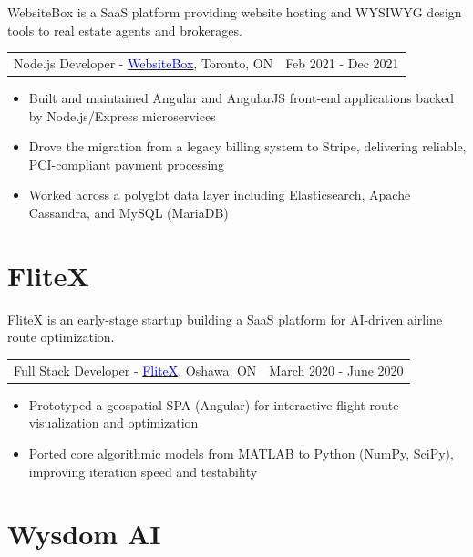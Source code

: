\documentclass[margin]{res}
\begin{document}
\begin{resume}
	WebsiteBox is a SaaS platform providing website hosting and WYSIWYG design tools
	to real estate agents and brokerages.

	\begin{tabular}{p{3in} r} %
		Node.js Developer - \href{https://websitebox.com}{\textcolor{blue}{WebsiteBox}}, Toronto, ON & Feb 2021 - Dec 2021
	\end{tabular}

	\begin{itemize} %
		\item Built and maintained Angular and AngularJS front-end applications backed by Node.js/Express microservices
		\item Drove the migration from a legacy billing system to Stripe, delivering reliable, PCI-compliant payment processing
		\item Worked across a polyglot data layer including Elasticsearch, Apache Cassandra, and MySQL (MariaDB)
	\end{itemize}

	\normalsize{\section{FliteX}}

	FliteX is an early-stage startup building a SaaS platform for AI-driven airline route optimization.

	\begin{tabular}{p{3in} r} %
		Full Stack Developer - \href{https://flitex.net/}{\textcolor{blue}{FliteX}}, Oshawa, ON & March 2020 - June 2020
	\end{tabular}
	\begin{itemize} %
		\item Prototyped a geospatial SPA (Angular) for interactive flight route visualization and optimization
		\item Ported core algorithmic models from MATLAB to Python (NumPy, SciPy), improving iteration speed and testability
	\end{itemize}

	\normalsize{\section{Wysdom AI}}


\end{resume}
\end{document}
